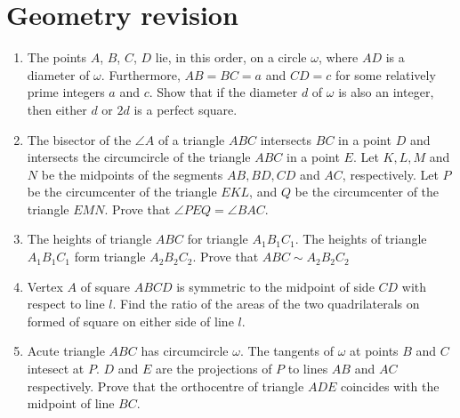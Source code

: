 \documentclass{article}
\begin{document}
\section{Geometry revision}
\begin{enumerate}
  \item %
  The points $A$, $B$, $C$, $D$ lie, in this order, on a circle $\omega$, where $AD$ is a diameter of $\omega$. Furthermore, $AB = BC = a$ and $CD = c$ for some relatively prime integers $a$ and $c$. Show that if the diameter $d$ of $\omega$ is also an integer, then either $d$ or $2d$ is a perfect square.

  \item %
  The bisector of the $\angle A$ of a triangle $ABC$ intersects $BC$ in a point $D$ and intersects the circumcircle of the triangle $ABC$ in a point $E$. Let $K, L, M$ and $N$ be the midpoints of the segments $AB, BD, CD$ and $AC$, respectively. Let $P$ be the circumcenter of the triangle $EKL$, and $Q$ be the circumcenter of the triangle $EMN$. Prove that $\angle PEQ = \angle BAC$.

  \item %
  The heights of triangle $ABC$ for triangle $A_1B_1C_1$. The heights of triangle $A_1B_1C_1$ form triangle $A_2B_2C_2$. Prove that $ABC \sim A_2B_2C_2$

  \item %
  Vertex $A$ of square $ABCD$ is symmetric to the midpoint of side $CD$ with respect to line $l$. Find the ratio of the areas of the two quadrilaterals on formed of square on either side of line $l$.

  \item %
  Acute triangle $ABC$ has circumcircle $\omega$. The tangents of $\omega$ at points $B$ and $C$ intesect at $P$. $D$ and $E$ are the projections of $P$ to lines $AB$ and $AC$ respectively. Prove that the orthocentre of triangle $ADE$ coincides with the midpoint of line $BC$.


\end{enumerate}
\end{document}
